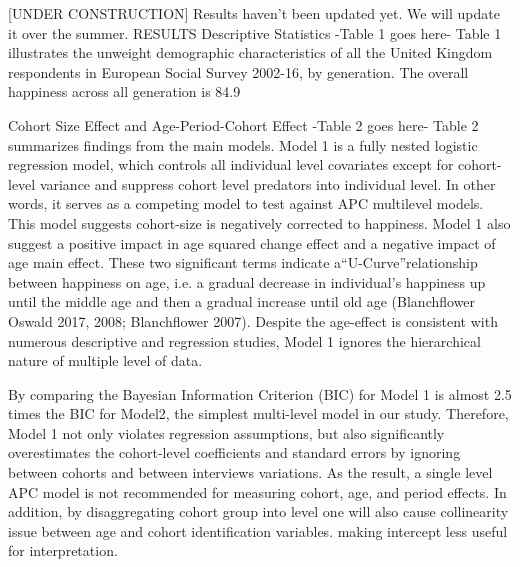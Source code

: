 [UNDER CONSTRUCTION]
Results haven’t been updated yet. We will update it over the summer.
RESULTS
Descriptive Statistics
-Table 1 goes here-
Table 1 illustrates the unweight demographic characteristics of all the United Kingdom respondents in European Social Survey 2002-16, by generation. The overall happiness across all generation is 84.9%

Cohort Size Effect and Age-Period-Cohort Effect
-Table 2 goes here-
Table 2 summarizes findings from the main models. Model 1 is a fully nested logistic regression model, which controls all individual level covariates except for cohort-level variance and suppress cohort level predators into individual level. In other words, it serves as a competing model to test against APC multilevel models. This model suggests cohort-size is negatively corrected to happiness. Model 1 also suggest a positive impact in age squared change effect and a negative impact of age main effect. These two significant terms indicate a“U-Curve”relationship between happiness on age, i.e. a gradual decrease in individual’s happiness up until the middle age and then a gradual increase until old age (Blanchflower Oswald 2017, 2008; Blanchflower 2007). Despite the age-effect is consistent with numerous descriptive and regression studies, Model 1 ignores the hierarchical nature of multiple level of data.

By comparing the Bayesian Information Criterion (BIC) for Model 1 is almost 2.5 times the BIC for Model2, the simplest multi-level model in our study. Therefore, Model 1 not only violates regression assumptions, but also significantly overestimates the cohort-level coefficients and standard errors by ignoring between cohorts and between interviews variations. As the result, a single level APC model is not recommended for measuring cohort, age, and period effects. In addition, by disaggregating cohort group into level one will also cause collinearity issue between age and cohort identification variables. making intercept less useful for interpretation.

